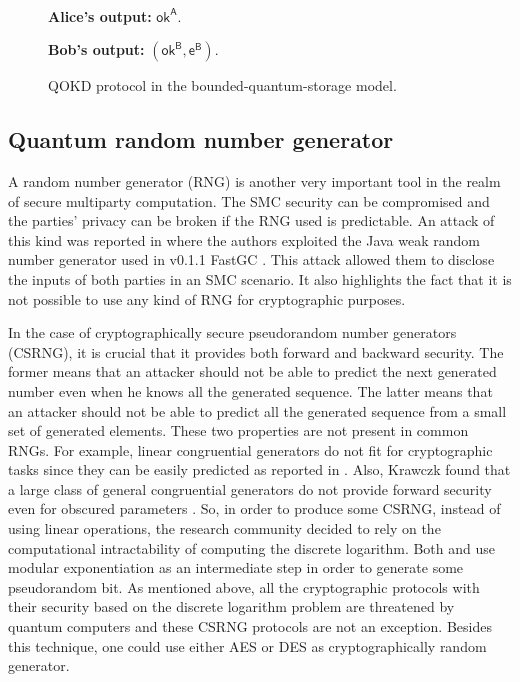 \begin{figure}[h!]
\begin{tcolorbox}
            
            \
            
        \textbf{Alice's output:} $\mathsf{ok}^{\mathsf{A}}$.
        
        \textbf{Bob's output:} $(\mathsf{ok}^{\mathsf{B}}, \mathsf{e}^\mathsf{B})$.
        
        \end{tcolorbox}
    \caption{QOKD protocol in the bounded-quantum-storage model.}
    \label{fig:QOKD_prot}
\end{figure}


\subsection{Quantum random number generator}

A random number generator (RNG) is another very important tool in the realm of secure multiparty computation. The SMC security can be compromised and the parties' privacy can be broken if the RNG used is predictable. An attack of this kind was reported in \cite{ALSZ13} where the authors exploited the Java weak random number generator used in v0.1.1 FastGC \cite{YE11}. This attack allowed them to disclose the inputs of both parties in an SMC scenario. It also highlights the fact that it is not possible to use any kind of RNG for cryptographic purposes.

In the case of cryptographically secure pseudorandom number generators (CSRNG), it is crucial that it provides both forward and backward security. The former means that an attacker should not be able to predict the next generated number even when he knows all the generated sequence. The latter means that an attacker should not be able to predict all the generated sequence from a small set of generated elements. These two properties are not present in common RNGs. For example, linear congruential generators do not fit for cryptographic tasks since they can be easily predicted as reported in \cite{HS85}. Also, Krawczk found that a large class of general congruential generators do not provide forward security even for obscured parameters \cite{K92}. So, in order to produce some CSRNG, instead of using linear operations, the research community decided to rely on the computational intractability of computing the discrete logarithm. Both \cite{BM84} and \cite{BBS86} use modular exponentiation as an intermediate step in order to generate some pseudorandom bit. As mentioned above, all the cryptographic protocols with their security based on the discrete logarithm problem are threatened by quantum computers and these CSRNG protocols are not an exception. Besides this technique, one could use either AES or DES as cryptographically random generator.

